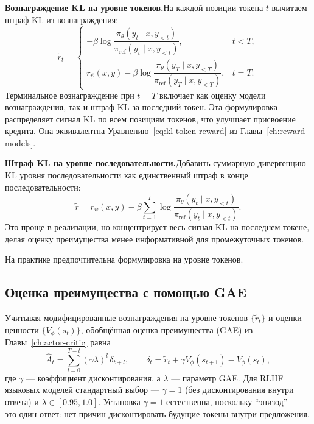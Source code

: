 \textbf{Вознаграждение KL на уровне токенов.}\quad На каждой позиции токена $t$ вычитаем штраф KL из вознаграждения:
\begin{equation}
\label{eq:per-token-kl}
\tilde{r}_t = \begin{cases}
  -\beta \log\dfrac{\pi_\theta(y_t \mid x, y_{<t})}{\pi_{\mathrm{ref}}(y_t \mid x, y_{<t})}, & t < T, \\[6pt]
  r_\psi(x, y) - \beta \log\dfrac{\pi_\theta(y_T \mid x, y_{<T})}{\pi_{\mathrm{ref}}(y_T \mid x, y_{<T})}, & t = T.
\end{cases}
\end{equation}
Терминальное вознаграждение при $t = T$ включает как оценку модели вознаграждения, так и штраф KL за последний токен. Эта формулировка распределяет сигнал KL по всем позициям токенов, что улучшает присвоение кредита. Она эквивалентна Уравнению~\eqref{eq:kl-token-reward} из Главы~\ref{ch:reward-models}.

\textbf{Штраф KL на уровне последовательности.}\quad Добавить суммарную дивергенцию KL уровня последовательности как единственный штраф в конце последовательности:
\[
\tilde{r} = r_\psi(x, y) - \beta \sum_{t=1}^{T} \log\frac{\pi_\theta(y_t \mid x, y_{<t})}{\pi_{\mathrm{ref}}(y_t \mid x, y_{<t})}.
\]
Это проще в реализации, но концентрирует весь сигнал KL на последнем токене, делая оценку преимущества менее информативной для промежуточных токенов.

На практике предпочтительна формулировка на уровне токенов.

\subsection{Оценка преимущества с помощью GAE}
\label{sec:gae-lm}

Учитывая модифицированные вознаграждения на уровне токенов $\{\tilde{r}_t\}$ и оценки ценности $\{V_\phi(s_t)\}$, обобщённая оценка преимущества (GAE) из Главы~\ref{ch:actor-critic} равна
\begin{equation}
\label{eq:gae-lm}
\hat{A}_t = \sum_{l=0}^{T-t} (\gamma\lambda)^l \,\delta_{t+l}, \qquad \delta_t = \tilde{r}_t + \gamma V_\phi(s_{t+1}) - V_\phi(s_t),
\end{equation}
где $\gamma$ --- коэффициент дисконтирования, а $\lambda$ --- параметр GAE. Для RLHF языковых моделей стандартный выбор --- $\gamma = 1$ (без дисконтирования внутри ответа) и $\lambda \in [0.95, 1.0]$. Установка $\gamma = 1$ естественна, поскольку ``эпизод'' --- это один ответ: нет причин дисконтировать будущие токены внутри предложения.

